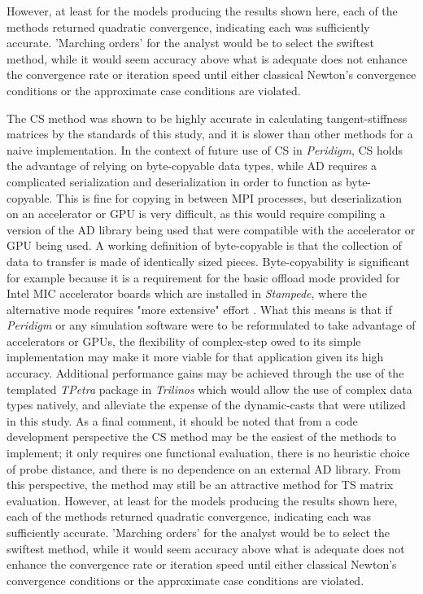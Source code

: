 \documentclass[preprint,12pt]{elsarticle}
\begin{document}
However, at least for the models producing the results shown here, each of the
methods returned quadratic convergence, indicating each was sufficiently
accurate. 'Marching orders' for the analyst would be to select the swiftest
method, while it would seem accuracy above what is adequate does not enhance
the convergence rate or iteration speed until either classical Newton's convergence
conditions or the approximate case conditions are violated. 

The CS method was shown to be highly accurate in calculating tangent-stiffness
matrices by the standards of this study, and it is slower than other methods
for a naive implementation. In the context of future use of CS in
\emph{Peridigm}, CS holds the advantage of relying on byte-copyable data types,
while AD requires a complicated serialization and deserialization in order to
function as byte-copyable. This is fine for copying in between MPI processes,
but deserialization on an accelerator or GPU is very difficult, as this would
require compiling a version of the AD library being used that were compatible
with the accelerator or GPU being used. A working definition of byte-copyable
is that the collection of data to transfer is made of identically sized pieces.
Byte-copyability is significant for example because it is a requirement for the
basic offload mode provided for Intel MIC accelerator boards which are
installed in \emph{Stampede}, where the alternative mode requires "more
extensive" effort \cite{intel_byte_copyable}. What this means is that if
\emph{Peridigm} or any simulation software were to be reformulated to take
advantage of accelerators or GPUs, the flexibility of complex-step owed to its
simple implementation may make it more viable for that application given its
high accuracy. Additional performance gains may be achieved through the use of
the templated \emph{TPetra} package in \emph{Trilinos} which would allow the
use of complex data types natively, and alleviate the expense of the
dynamic-casts that were utilized in this study.  As a final comment, it should
be noted that from a code development perspective the CS method may be the
easiest of the methods to implement; it only requires one functional
evaluation, there is no heuristic choice of probe distance, and there is no
dependence on an external AD library.  From this perspective, the method may
still be an attractive method for TS matrix evaluation. However,
at least for the models producing the results shown here, each of the
methods returned quadratic convergence, indicating each was sufficiently
accurate. 'Marching orders' for the analyst would be to select the swiftest
method, while it would seem accuracy above what is adequate does not
enhance the convergence rate or iteration speed until either classical
Newton's convergence conditions or the approximate case conditions are
violated. 
\end{document}
